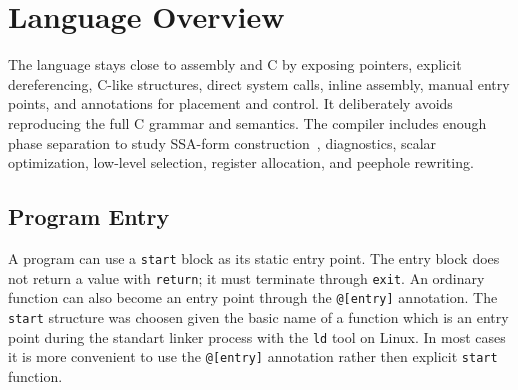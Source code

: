 \documentclass[10pt,twocolumn]{article}
\begin{document}


\section{Language Overview}
\par The language stays close to assembly and C by exposing pointers, explicit dereferencing, C-like structures, direct system calls, inline assembly, manual entry points, and annotations for placement and control. It deliberately avoids reproducing the full C grammar and semantics. The compiler includes enough phase separation to study SSA-form construction~\cite{cytron1991ssa}, diagnostics, scalar optimization, low-level selection, register allocation, and peephole rewriting.

\subsection{Program Entry}
\par A program can use a \texttt{start} block as its static entry point. The entry block does not return a value with \texttt{return}; it must terminate through \texttt{exit}. An ordinary function can also become an entry point through the \texttt{@[entry]} annotation. The \texttt{start} structure was choosen given the basic name of a function which is an entry point during the standart linker process with the \texttt{ld} tool on Linux. In most cases it is more convenient to use the \texttt{@[entry]} annotation rather then explicit \texttt{start} function.
\end{document}
